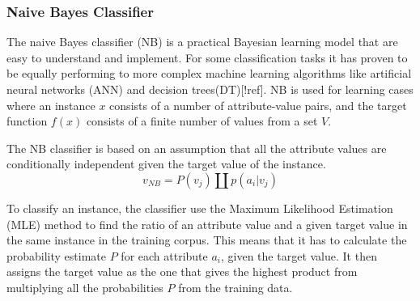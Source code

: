 \subsubsection{Naive Bayes Classifier}
		The naive Bayes classifier (NB) is a practical Bayesian learning model that are easy to understand and implement. For some classification tasks it has proven to be equally performing to more complex machine learning algorithms like artificial neural networks (ANN) and decision trees(DT)[!ref]. NB is used for learning cases where an instance $x$ consists of a number of attribute-value pairs, and the target function $f(x)$ consists of a finite number of values from a set $V$.

The NB classifier is based on an assumption that all the attribute values are conditionally independent given the target value of the instance.
\begin{equation}
\label{equation:nbc}
v_{NB} = P(v_j) \amalg p(a_i|v_j)
\end{equation}

To classify an instance, the classifier use the Maximum Likelihood Estimation (MLE) method to find the ratio of an attribute value and a given target value in the same instance in the training corpus. This means that it has to calculate the probability estimate $P$ for each attribute $a_i$, given the target value. It then assigns the target value as the one that gives the highest product from multiplying all the probabilities $P$ from the training data.